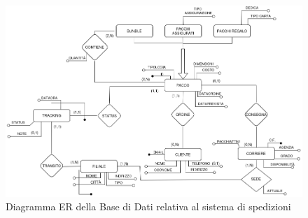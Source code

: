 \begin{figure}[H]
\centering
\includegraphics[width=1\textwidth]{Resources/ER.png}
\caption{Diagramma ER della Base di Dati relativa al sistema di spedizioni}
\label{ER}
\end{figure}